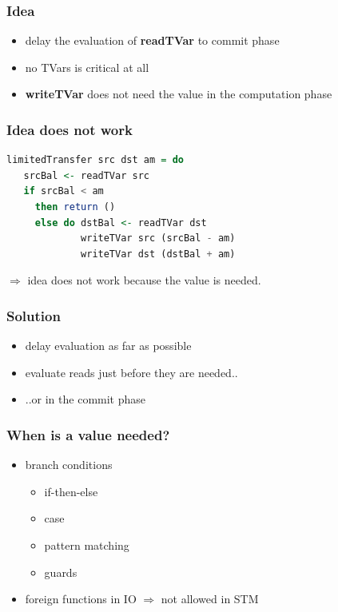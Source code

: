 \documentclass{beamer}
\newcommand{\code}[1]{\textbf{#1}}
\begin{document}
\begin{frame}
 \frametitle{Idea}
 \begin{itemize}\setlength\itemsep{1em}
  \item delay the evaluation of \code{readTVar} to commit phase
  \item no TVars is critical at all  
  \item \code{writeTVar} does not need the value in the computation phase
 \end{itemize}
\end{frame}
  
\begin{frame}[fragile]
   \frametitle{Idea does not work}
   \begin{lstlisting}[language=Haskell]
limitedTransfer src dst am = do
   srcBal <- readTVar src
   if srcBal < am
     then return ()
     else do dstBal <- readTVar dst
             writeTVar src (srcBal - am)
             writeTVar dst (dstBal + am)
   \end{lstlisting}
   \vfill
   $\Rightarrow$ idea does not work because the value is needed.
\end{frame}


  \begin{frame}
   \frametitle{Solution}
   \begin{itemize}\setlength\itemsep{1em}
    \item delay evaluation as far as possible
    \item evaluate reads just before they are needed..
    \item ..or in the commit phase
   \end{itemize}
  \end{frame}


  \begin{frame}
   \frametitle{When is a value needed?}
   \begin{itemize}\setlength\itemsep{1em}
    \item branch conditions
       \begin{itemize}
        \item if-then-else
        \item case
        \item pattern matching
        \item guards
       \end{itemize}
    \item foreign functions in IO $\Rightarrow$ not allowed in STM
   \end{itemize}
  \end{frame}
  
\end{document}

